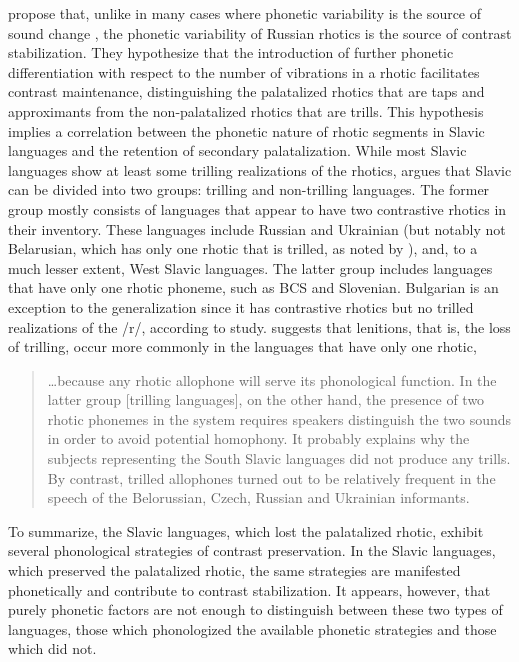 \documentclass[output=paper]{langscibook}
\begin{document}
\citet{IskarousKavitskaya2010} propose that, unlike in many cases where phonetic variability is the source of sound change \citep{Ohala1993}, the phonetic variability of Russian rhotics is the source of contrast stabilization. They hypothesize that the introduction of further phonetic differentiation with respect to the number of vibrations in a rhotic facilitates contrast maintenance, distinguishing the palatalized rhotics that are taps and approximants from the non-palatalized rhotics that are trills. This hypothesis implies a correlation between the phonetic nature of rhotic segments in Slavic languages and the retention of secondary palatalization. While most Slavic languages show at least some trilling realizations of the rhotics, \citet[305]{Jaworski2018} argues that Slavic can be divided into two groups: trilling and non-trilling languages. The former group mostly consists of languages that appear to have two contrastive rhotics in their inventory. These languages include Russian and Ukrainian (but notably not Belarusian, which has only one rhotic that is trilled, as noted by \citealt{BirdLitvin2020}), and, to a much lesser extent, West Slavic languages. The latter group includes languages that have only one rhotic phoneme, such as BCS and Slovenian. Bulgarian is an exception to the generalization since it has contrastive rhotics but no trilled realizations of the /r/, according to  study. \citet[317]{Jaworski2018} suggests that lenitions, that is, the loss of trilling, occur more commonly in the languages that have only one rhotic,

\begin{quote}
…because any rhotic allophone will serve its phonological function. In the latter group [trilling languages], on the other hand, the presence of two rhotic phonemes in the system requires speakers distinguish the two sounds in order to avoid potential homophony. It probably explains why the subjects representing the South Slavic languages did not produce any trills. By contrast, trilled allophones turned out to be relatively frequent in the speech of the Belorussian, Czech, Russian and Ukrainian informants.
\end{quote}

To summarize, the Slavic languages, which lost the palatalized rhotic, exhibit several phonological strategies of contrast preservation. In the Slavic languages, which preserved the palatalized rhotic, the same strategies are manifested phonetically and contribute to contrast stabilization. It appears, however, that purely phonetic factors are not enough to distinguish between these two types of languages, those which phonologized the available phonetic strategies and those which did not.
\end{document}
